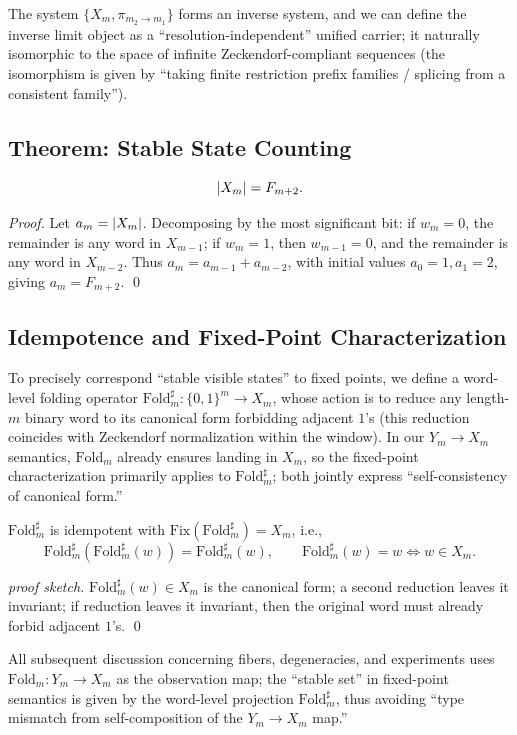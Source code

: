 The system $\{X_m,\pi_{m_2\to m_1}\}$ forms an inverse system, and we can define the inverse limit object as a ``resolution-independent'' unified carrier; it naturally isomorphic to the space of infinite Zeckendorf-compliant sequences (the isomorphism is given by ``taking finite restriction prefix families / splicing from a consistent family'').

\subsection{Theorem: Stable State Counting}

\begin{theorem}\label{thm:Xm-count}
\[
\left\lvert X_m\right\rvert=F_{m+2}.
\]
\end{theorem}

\begin{proof}
Let $a_m=\left\lvert X_m\right\rvert$. Decomposing by the most significant bit: if $w_m=0$, the remainder is any word in $X_{m-1}$; if $w_m=1$, then $w_{m-1}=0$, and the remainder is any word in $X_{m-2}$. Thus $a_m=a_{m-1}+a_{m-2}$, with initial values $a_0=1,a_1=2$, giving $a_m=F_{m+2}$. \qed
\end{proof}

\subsection{Idempotence and Fixed-Point Characterization}

To precisely correspond ``stable visible states'' to fixed points, we define a word-level folding operator $\mathrm{Fold}_m^\sharp:\{0,1\}^m\to X_m$, whose action is to reduce any length-$m$ binary word to its canonical form forbidding adjacent $1$'s (this reduction coincides with Zeckendorf normalization within the window). In our $Y_m\to X_m$ semantics, $\mathrm{Fold}_m$ already ensures landing in $X_m$, so the fixed-point characterization primarily applies to $\mathrm{Fold}_m^\sharp$; both jointly express ``self-consistency of canonical form.''

\begin{theorem}\label{thm:fold-sharp-fix}
$\mathrm{Fold}_m^\sharp$ is idempotent with $\mathrm{Fix}(\mathrm{Fold}_m^\sharp)=X_m$, i.e.,
\[
\mathrm{Fold}_m^\sharp(\mathrm{Fold}_m^\sharp(w))=\mathrm{Fold}_m^\sharp(w),\qquad
\mathrm{Fold}_m^\sharp(w)=w\iff w\in X_m.
\]
\end{theorem}

\begin{proof}[proof sketch]
$\mathrm{Fold}_m^\sharp(w)\in X_m$ is the canonical form; a second reduction leaves it invariant; if reduction leaves it invariant, then the original word must already forbid adjacent $1$'s. \qed
\end{proof}

\begin{remark}
All subsequent discussion concerning fibers, degeneracies, and experiments uses $\mathrm{Fold}_m:Y_m\to X_m$ as the observation map; the ``stable set'' in fixed-point semantics is given by the word-level projection $\mathrm{Fold}_m^\sharp$, thus avoiding ``type mismatch from self-composition of the $Y_m\to X_m$ map.''
\end{remark}
